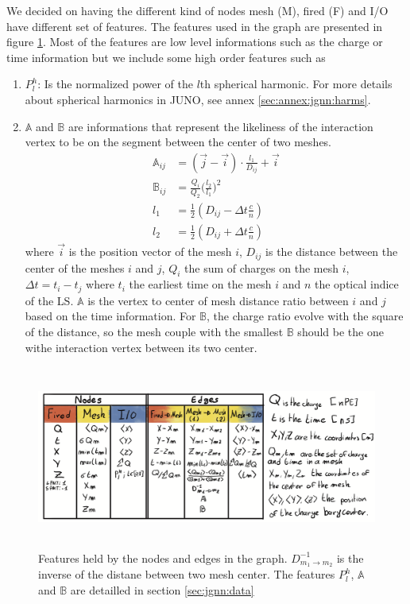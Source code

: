 \documentclass[../main.tex]{subfiles}
\begin{document}
We decided on having the different kind of nodes {\color{Dandelion} mesh (M)}, {\color{red} fired (F)} and {\color{blue} I/O} have different set of features. The features used in the graph are presented in figure \ref{fig:jgnn:graph_features}. Most of the features are low level informations such as the charge or time information but we include some high order features such as
\begin{enumerate}
  \item $P^h_l$: Is the normalized power of the $l$th spherical harmonic. For more details about spherical harmonics in JUNO, see annex \ref{sec:annex:jgnn:harms}.
  \item $\mathbb{A}$ and $\mathbb{B}$ are informations that represent the likeliness of the interaction vertex to be on the segment between the center of two meshes.
    \begin{align}
      \mathbb{A}_{ij} &= (\vec{j} - \vec{i})\cdot\frac{l_1}{D_{ij}} + \vec{i} \\
      \mathbb{B}_{ij} &= \frac{Q_i}{Q_2} \bigg(\frac{l_2}{l_1}\bigg)^2 \\
      l_1 &= \frac{1}{2}(D_{ij} - \Delta t \frac{c}{n}) \\
      l_2 &= \frac{1}{2}(D_{ij} + \Delta t \frac{c}{n})
    \end{align}
    where $\vec{i}$ is the position vector of the mesh $i$, $D_{ij}$ is the distance between the center of the meshes $i$ and $j$, $Q_i$ the sum of charges on the mesh $i$, $\Delta t = t_i - t_j$ where $t_i$ the earliest time on the mesh $i$ and $n$ the optical indice of the LS. $\mathbb{A}$ is the vertex to center of mesh distance ratio between $i$ and $j$ based on the time information. For $\mathbb{B}$, the charge ratio evolve with the square of the distance, so the mesh couple with the smallest $\mathbb{B}$ should be the one withe interaction vertex between its two center.
\end{enumerate}

\begin{figure}[ht]
  \centering
  \includegraphics[height=6cm]{images/jgnn/graph_features.png}
  \caption{Features held by the nodes and edges in the graph. $D^{-1}_{m_1 \rightarrow m_2}$ is the inverse of the distane between two mesh center. The features $P^h_l$, $\mathbb{A}$ and $\mathbb{B}$ are detailled in section \ref{sec:jgnn:data}}
  \label{fig:jgnn:graph_features}
\end{figure}
\end{document}
